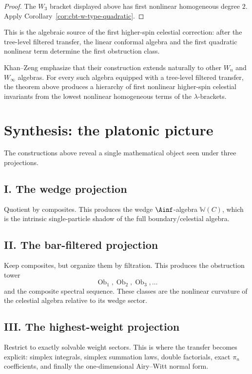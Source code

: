 \begin{proof}
The $W_3$ bracket displayed above has first nonlinear homogeneous degree $2$. Apply Corollary~\ref{cor:cbt-w-type-quadratic}.
\end{proof}

\begin{remark}
This is the algebraic source of the first higher-spin celestial
correction: after the tree-level filtered transfer, the linear
conformal algebra and the first quadratic nonlinear term determine the
first obstruction class.
\end{remark}

\begin{remark}[beyond $W_3$]
Khan--Zeng emphasize that their construction extends naturally to
other $W_n$ and $W_\infty$ algebras. For every such algebra equipped
with a tree-level filtered transfer, the theorem above produces a
hierarchy of first nonlinear higher-spin celestial invariants from the
lowest nonlinear homogeneous terms of the $\lambda$-brackets.
\end{remark}

\section{Synthesis: the platonic picture}

The constructions above reveal a single mathematical object seen under three projections.

\subsection*{I. The wedge projection}
Quotient by composites. This produces the wedge $\Ainf$-algebra $\mathbb{W}(C)$, which is the intrinsic single-particle shadow of the full boundary/celestial algebra.

\subsection*{II. The bar-filtered projection}
Keep composites, but organize them by filtration. This produces the obstruction tower
\[
\operatorname{Ob}_1,\operatorname{Ob}_2,\operatorname{Ob}_3,\dots
\]
and the composite spectral sequence. These classes are the nonlinear curvature of the celestial algebra relative to its wedge sector.

\subsection*{III. The highest-weight projection}
Restrict to exactly solvable weight sectors. This is where the transfer becomes explicit: simplex integrals, simplex summation laws, double factorials, exact $\pi_n$ coefficients, and finally the one-dimensional Airy--Witt normal form.

